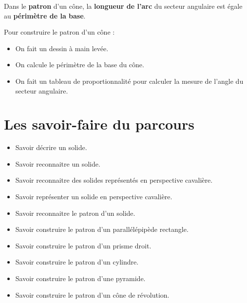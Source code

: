 \documentclass[a4paper,dvipsnames]{article}
\begin{document}
\begin{Rq}
Dans le \textbf{patron} d'un cône, la \textbf{longueur de l'arc} du secteur angulaire est égale au \textbf{périmètre de la base}.
\end{Rq}

\begin{Mt}
Pour construire le patron d'un cône :
\begin{itemize}
\item On fait un dessin à main levée.
\item On calcule le périmètre de la base du cône.
\item On fait un tableau de proportionnalité pour calculer la mesure de l'angle du secteur angulaire.
\end{itemize}
\end{Mt}

\section{Les savoir-faire du parcours}

\begin{CpsCol}
\begin{itemize}
\item Savoir décrire un solide.
\item Savoir reconnaitre un solide. 
\item Savoir reconnaitre des solides représentés en perspective cavalière.
\item Savoir représenter un solide en perspective cavalière.
\item Savoir reconnaitre le patron d'un solide.
\item Savoir construire le patron d'un parallélépipède rectangle.
\item Savoir construire le patron d'un prisme droit. 
\item Savoir construire le patron d'un cylindre. 
\item Savoir construire le patron d'une pyramide. 
\item Savoir construire le patron d'un cône de révolution. 
\end{itemize}
\end{CpsCol}
\end{document}
